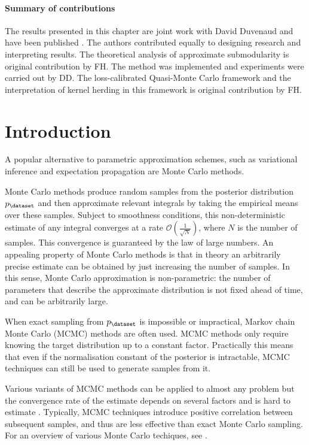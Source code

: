 
\paragraph{Summary of contributions} The results presented in this chapter are joint work with David Duvenaud and have been published \citep{Huszar2012herding}. The authors contributed equally to designing research and interpreting results. The theoretical analysis of approximate submodularity is original contribution by FH. The method was implemented and experiments were carried out by DD. The loss-calibrated Quasi-Monte Carlo framework and the interpretation of kernel herding in this framework is original contribution by FH.

\section{Introduction}

A popular alternative to parametric approximation schemes, such as variational inference and expectation propagation are Monte Carlo methods.

Monte Carlo methods produce random samples from the posterior distribution $p_\dataset$ and then approximate relevant integrals by taking the empirical means over these samples. Subject to smoothness conditions, this non-deterministic estimate of any integral converges at a rate $\mathcal{O}(\frac{1}{\sqrt{N}})$, where $N$ is the number of samples. This convergence is guaranteed by the law of large numbers. An appealing property of Monte Carlo methods is that in theory an arbitrarily precise estimate can be obtained by just increasing the number of samples. In this sense, Monte Carlo approximation is non-parametric: the number of parameters that describe the approximate distribution is not fixed ahead of time, and can be arbitrarily large.

When exact sampling from $p_\dataset$ is impossible or impractical, Markov chain Monte Carlo (MCMC) methods are often used. MCMC methods only require knowing the target distribution up to a constant factor. Practically this means that even if the normalisation constant of the posterior is intractable, MCMC techniques can still be used to generate samples from it.

Various variants of MCMC methods can be applied to almost any problem but the convergence rate of the estimate depends on several factors and is hard to estimate \citep{CowlesCarlin96}. Typically, MCMC techniques introduce positive correlation between subsequent samples, and thus are less effective than exact Monte Carlo sampling. For an overview of various Monte Carlo techiques, see \citep{Murray2007}.

